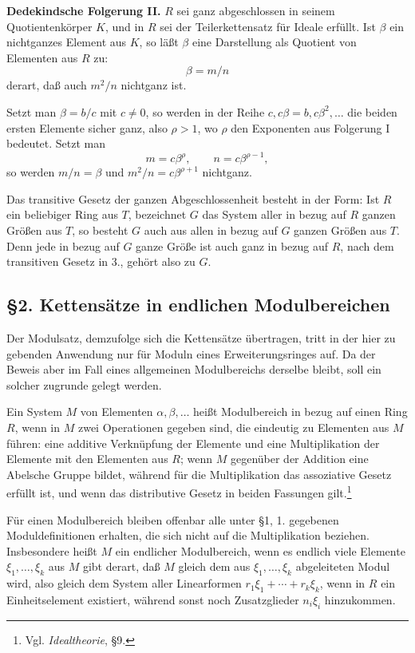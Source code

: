 \documentclass[11pt]{article}
\begin{document}
\medskip
\noindent\textbf{Dedekindsche Folgerung II.} $R$ sei ganz abgeschlossen in seinem
Quotientenkörper $K$, und in $R$ sei der Teilerkettensatz für Ideale erfüllt. Ist
$\beta$ ein nichtganzes Element aus $K$, so läßt $\beta$ eine Darstellung als
Quotient von Elementen aus $R$ zu:
\[
        \beta=m/n
\]
derart, daß auch $m^2/n$ nichtganz ist.

Setzt man $\beta=b/c$ mit $c\ne0$, so werden in der Reihe
$c,c\beta=b,c\beta^2,\ldots$ die beiden ersten Elemente sicher ganz, also $\rho>1$,
wo $\rho$ den Exponenten aus Folgerung I bedeutet. Setzt man
\[
        m=c\beta^\rho,\qquad n=c\beta^{\rho-1},
\]
so werden $m/n=\beta$ und $m^2/n=c\beta^{\rho+1}$ nichtganz.

Das transitive Gesetz der ganzen Abgeschlossenheit besteht in der Form: Ist $R$
ein beliebiger Ring aus $T$, bezeichnet $G$ das System aller in bezug auf $R$
ganzen Größen aus $T$, so besteht $G$ auch aus allen in bezug auf $G$ ganzen
Größen aus $T$. Denn jede in bezug auf $G$ ganze Größe ist auch ganz in bezug
auf $R$, nach dem transitiven Gesetz in 3., gehört also zu $G$.

\subsection*{§2. Kettensätze in endlichen Modulbereichen}

Der Modulsatz, demzufolge sich die Kettensätze übertragen, tritt in der hier zu
gebenden Anwendung nur für Moduln eines Erweiterungsringes auf. Da der Beweis
aber im Fall eines allgemeinen Modulbereichs derselbe bleibt, soll ein solcher
zugrunde gelegt werden.

Ein System $M$ von Elementen $\alpha,\beta,\ldots$ heißt Modulbereich in bezug
auf einen Ring $R$, wenn in $M$ zwei Operationen gegeben sind, die eindeutig zu
Elementen aus $M$ führen: eine additive Verknüpfung der Elemente und eine
Multiplikation der Elemente mit den Elementen aus $R$; wenn $M$ gegenüber der
Addition eine Abelsche Gruppe bildet, während für die Multiplikation das
assoziative Gesetz erfüllt ist, und wenn das distributive Gesetz in beiden Fassungen
gilt.\footnote{Vgl. \emph{Idealtheorie}, §9.}

Für einen Modulbereich bleiben offenbar alle unter §1, 1. gegebenen
Moduldefinitionen erhalten, die sich nicht auf die Multiplikation beziehen.
Insbesondere heißt $M$ ein endlicher Modulbereich, wenn es endlich viele Elemente
$\xi_1,\ldots,\xi_k$ aus $M$ gibt derart, daß $M$ gleich dem aus
$\xi_1,\ldots,\xi_k$ abgeleiteten Modul wird, also gleich dem System aller
Linearformen $r_1\xi_1+\cdots+r_k\xi_k$, wenn in $R$ ein Einheitselement
existiert, während sonst noch Zusatzglieder $n_i\xi_i$ hinzukommen.
\end{document}
